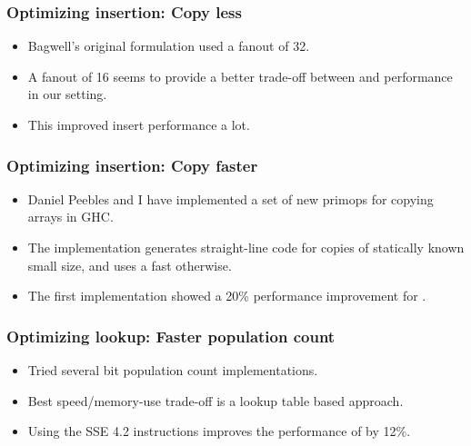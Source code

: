 \documentclass[xetex,mathserif,serif]{beamer}
\newcommand{\code}[1]{\mbox{\texttt{\small{\color{CodeColor}{#1}}}}}
\begin{document}
\begin{frame}
  \frametitle{Optimizing insertion: Copy less}

  \begin{itemize}
  \item Bagwell's original formulation used a fanout of 32.
  \item A fanout of 16 seems to provide a better trade-off between
    \code{lookup} and \code{insert} performance in our setting.
  \item This improved insert performance a lot.
  \end{itemize}
\end{frame}

\begin{frame}
  \frametitle{Optimizing insertion: Copy faster}

  \begin{itemize}
  \item Daniel Peebles and I have implemented a set of new primops for
    copying arrays in GHC.
  \item The implementation generates straight-line code for copies of
    statically known small size, and uses a fast \code{memcpy}
    otherwise.
  \item The first implementation showed a 20\% performance improvement
    for \code{insert}.
  \end{itemize}
\end{frame}

\begin{frame}
  \frametitle{Optimizing lookup: Faster population count}
  \begin{itemize}
  \item Tried several bit population count implementations.
  \item Best speed/memory-use trade-off is a lookup table based
    approach.
  \item Using the \code{POPCNT} SSE 4.2 instructions improves the
    performance of \code{lookup} by 12\%.
  \end{itemize}
\end{frame}
\end{document}
